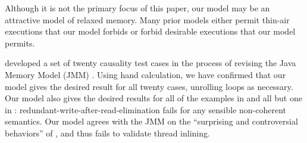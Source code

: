Although it is not the primary focus of this paper, our model may be an
attractive model of relaxed memory.  Many prior models either permit
thin-air executions that our model forbids or forbid desirable executions
that our model permits.



\citet{PughWebsite} developed a set of twenty {causality test cases} in the
process of revising the Java Memory Model (JMM)
\cite{Manson:2005:JMM:1047659.1040336}.  Using hand calculation, we have
confirmed that our model gives the desired result for all twenty cases,
unrolling loops as necessary.  Our model also gives the desired results for
all of the examples in \citet[]{DBLP:conf/esop/BattyMNPS15} and
all but one in \citet[]{SevcikThesis}:
redundant-write-after-read-elimination fails for any
sensible non-coherent semantics.  Our model agrees with the JMM on the
``surprising and controversial behaviors'' of \citet[]{Manson:2005:JMM:1047659.1040336}, and thus fails to validate thread
inlining.

